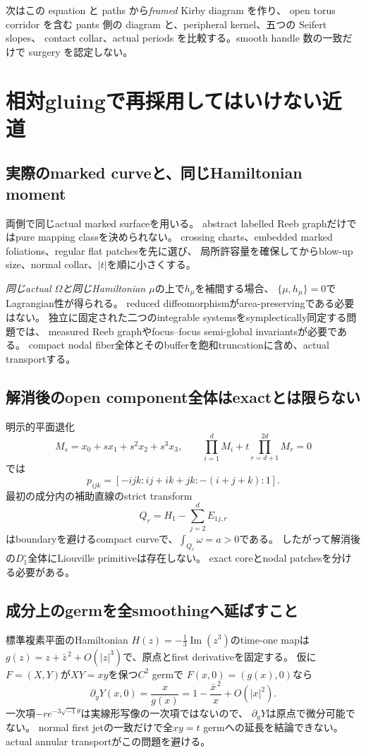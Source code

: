 \documentclass[11pt,a4paper]{article}
\begin{document}
次はこの equation と paths から\emph{framed} Kirby diagram を作り、
open torus corridor を含む pants 側の diagram と、peripheral kernel、五つの Seifert slopes、
contact collar、actual periods を比較する。smooth handle 数の一致だけで surgery を認定しない。


\section{相対gluingで再採用してはいけない近道}

\subsection{実際のmarked curveと、同じHamiltonian moment}

両側で同じactual marked surfaceを用いる。
abstract labelled Reeb graphだけではpure mapping classを決められない。
crossing charts、embedded marked foliations、regular flat patchesを先に選び、
局所許容量を確保してからblow-up size、normal collar、$|t|$を順に小さくする。

\emph{同じactual $\Omega$と同じHamiltonian $\mu$}の上で$h_\mu$を補間する場合、
$\{\mu,h_\mu\}=0$でLagrangian性が得られる。
reduced diffeomorphismがarea-preservingである必要はない。
独立に固定された二つのintegrable systemsをsymplectically同定する問題では、
measured Reeb graphやfocus--focus semi-global invariantsが必要である\cite{DMT,IKM,VuNgoc}。
compact nodal fiber全体とそのbufferを飽和truncationに含め、actual transportする。

\subsection{解消後のopen component全体はexactとは限らない}

明示的平面退化
\[
 M_s=x_0+s x_1+s^2x_2+s^3x_3,\qquad
 \prod_{i=1}^dM_i+t\prod_{r=d+1}^{2d}M_r=0
\]
では
\[
 p_{ijk}=[-ijk:ij+ik+jk:-(i+j+k):1].
\]
最初の成分内の補助直線のstrict transform
\[
 Q_r=H_1-\sum_{j=2}^dE_{1j,r}
\]
はboundaryを避けるcompact curveで、$\int_{Q_r}\omega=a>0$である。
したがって解消後の$D_1^\circ$全体にLiouville primitiveは存在しない。
exact coreとnodal patchesを分ける必要がある。

\subsection{成分上のgermを全smoothingへ延ばすこと}

標準複素平面のHamiltonian
$H(z)=-\frac13\operatorname{Im}(z^3)$のtime-one mapは
$g(z)=z+\bar z^{\,2}+O(|z|^3)$で、原点とfirst derivativeを固定する。
仮に$F=(X,Y)$が$XY=xy$を保つ$C^2$ germで
$F(x,0)=(g(x),0)$なら
\[
 \partial_yY(x,0)=\frac{x}{g(x)}
 =1-\frac{\bar x^{\,2}}x+O(|x|^2).
\]
一次項$-re^{-3\sqrt{-1}\theta}$は実線形写像の一次項ではないので、
$\partial_yY$は原点で微分可能でない。
normal first jetの一致だけで全$xy=t$ germへの延長を結論できない。
actual annular transportがこの問題を避ける。
\end{document}
